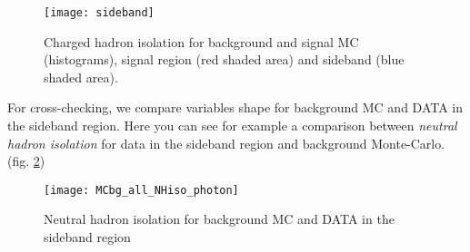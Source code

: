 \begin{figure}[ht!]
  \centering
  \texttt{[image: sideband]}\\[1cm]
  \caption{Charged hadron isolation for background and signal MC (histograms), signal region (red shaded area) and
  sideband (blue shaded area).}
  \label{sideband}
\end{figure}

For cross-checking, we compare variables shape for background MC and DATA in the sideband region.
Here you can see for example a comparison between \emph{neutral hadron isolation} for data in the sideband region and background Monte-Carlo.(fig. \ref{MCbg_all_NHiso_photon}) 

\begin{figure}[h!]
  \centering
  \texttt{[image: MCbg\_all\_NHiso\_photon]}\\[1cm]
  \caption{Neutral hadron isolation for background MC and DATA in the sideband region}
  \label{MCbg_all_NHiso_photon}
\end{figure}

